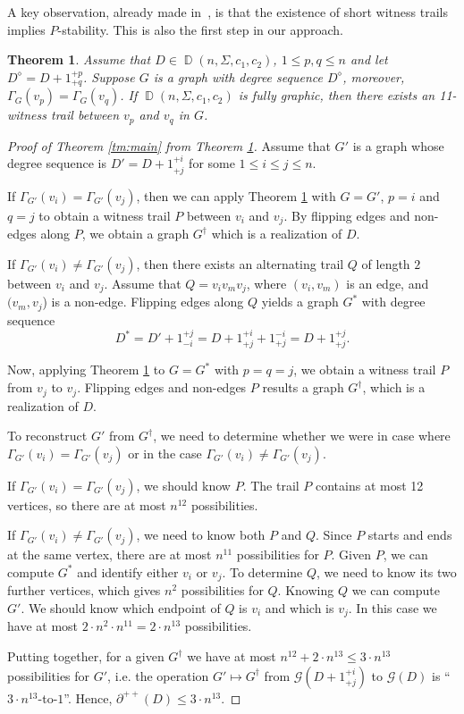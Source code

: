 \documentclass[11pt]{elsarticle}
\theoremstyle{plain}
\newtheorem{theorem}{Theorem}[section]
\theoremstyle{definition}
\newcommand{\dds}[4]{\operatorname{\mathbb D}(#1,#2,#3,#4)}
\newcommand{\pppp}[1]{\partial^{++}(#1)}
\begin{document}
A key observation, already made in~\cite{JMS92}, is that the existence of short witness trails implies $P$-stability. This is also the first step in our approach.

\begin{theorem}\label{th:alter}
Assume that  $D\in \dds{n}{\Sigma}{c_1}{c_2}$, $1\le p,q\le n$ and  let $D^\diamond=D+ 1^{+p}_{+q}$.  Suppose  $G$ is a graph with
degree sequence $D^\diamond$, moreover,  $\Gamma_G(v_p)=\Gamma_G(v_q)$.
If $\dds{n}{\Sigma}{c_1}{c_2}$ is fully graphic, then  there exists an 11-witness trail between $v_p$ and $v_q$ in $G$.
\end{theorem}
\begin{proof}[Proof of Theorem \ref{tm:main} from Theorem \ref{th:alter}]
Assume that $G'$  is a graph whose degree sequence is $D'=D+1^{+i}_{+j}$ for some $1\le i\le j\le n$.

If $\Gamma_{G'}(v_i)=\Gamma_{G'}(v_j)$, then  we can apply Theorem \ref{th:alter} with $G=G'$, $p=i$ and $q=j$ to obtain  a  witness trail  $P$  between $v_i$ and $v_j$.  By flipping edges and non-edges along  $P$, we obtain a graph $G^\dag$ which is a realization of $D.$


If $\Gamma_{G'}(v_i)\ne \Gamma_{G'}(v_j)$, then  there exists an alternating trail $Q$ of length $2$ between $v_i$ and $v_j$. Assume that $Q=v_iv_mv_j$, where $(v_i,v_m)$ is an edge, and $(v_m,v_j$) is a non-edge. Flipping edges along   $Q$ yields a graph $G^*$ with degree sequence  $$D^*=D'+1^{+j}_{-i}=D+1^{+i}_{+j}+1^{-i}_{+j}=D+1^{+j}_{+j}.$$

Now, applying Theorem \ref{th:alter} to $G=G^*$ with $p=q=j$, we obtain  a witness trail $P$ from  $v_j$ to $v_j$.  Flipping edges and non-edges  $P$     results a graph $G^\dagger$, which is a realization of $D.$


To reconstruct $G'$ from $G^\dagger$, we need to determine whether we were  in case  where $\Gamma_{G'}(v_i)=\Gamma_{G'}(v_j)$ or in the case $\Gamma_{G'}(v_i)\ne \Gamma_{G'}(v_j)$.

If $\Gamma_{G'}(v_i)=\Gamma_{G'}(v_j)$, we should know $P$. The  trail  $P$ contains at most 12 vertices, so there are at most $n^{12}$ possibilities.

If $\Gamma_{G'}(v_i)\ne \Gamma_{G'}(v_j)$, we need to know both $P$ and $Q$. Since $P$ starts and ends at the same vertex, there are at most $n^{11}$ possibilities for $P$. Given $P$,  we can compute $G^*$ and identify either  $v_i$ or $v_j$. To determine   $Q$, we  need to know  its two further vertices, which gives $n^2$ possibilities for  $Q$. Knowing $Q$ we can compute  $G'$. We should know which endpoint  of $Q$ is $v_i$ and which is $v_j$. In this case we have at most $2\cdot n^2\cdot n^{11}=2\cdot  n^{13}$ possibilities.

Putting together, for a given $G^\dagger$ we have at most $n^{12}+2\cdot n^{13}\le 3\cdot n^{13}$ possibilities for $G'$, i.e. the operation $G'\mapsto G^\dagger$ from $\mathcal{G}({D}+1^{+i}_{+j})$ to  $\mathcal{G}({D})$ is
    ``$3\cdot n^{13}$-to-$1$''. Hence, $\pppp{D}\le 3\cdot n^{13}$.
\end{proof}
\end{document}
